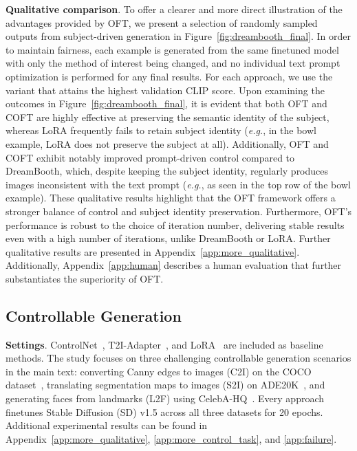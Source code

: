 \textbf{Qualitative comparison}. To offer a clearer and more direct illustration of the advantages provided by OFT, we present a selection of randomly sampled outputs from subject-driven generation in Figure~\ref{fig:dreambooth_final}. In order to maintain fairness, each example is generated from the same finetuned model with only the method of interest being changed, and no individual text prompt optimization is performed for any final results. For each approach, we use the variant that attains the highest validation CLIP score. Upon examining the outcomes in Figure~\ref{fig:dreambooth_final}, it is evident that both OFT and COFT are highly effective at preserving the semantic identity of the subject, whereas LoRA frequently fails to retain subject identity (\emph{e.g.}, in the bowl example, LoRA does not preserve the subject at all). Additionally, OFT and COFT exhibit notably improved prompt-driven control compared to DreamBooth, which, despite keeping the subject identity, regularly produces images inconsistent with the text prompt (\emph{e.g.}, as seen in the top row of the bowl example). These qualitative results highlight that the OFT framework offers a stronger balance of control and subject identity preservation. Furthermore, OFT’s performance is robust to the choice of iteration number, delivering stable results even with a high number of iterations, unlike DreamBooth or LoRA. Further qualitative results are presented in Appendix~\ref{app:more_qualitative}. Additionally, Appendix~\ref{app:human} describes a human evaluation that further substantiates the superiority of OFT.

\subsection{Controllable Generation}

\textbf{Settings}. ControlNet~\cite{zhang2023adding}, T2I-Adapter~\cite{mou2023t2i}, and LoRA~\cite{hulora2022} are included as baseline methods. The study focuses on three challenging controllable generation scenarios in the main text: converting Canny edges to images (C2I) on the COCO dataset~\cite{lin2014microsoft}, translating segmentation maps to images (S2I) on ADE20K~\cite{zhou2017scene}, and generating faces from landmarks (L2F) using CelebA-HQ~\cite{karras2018progressive,xia2021tedigan}. Every approach finetunes Stable Diffusion (SD) v1.5 across all three datasets for 20 epochs. Additional experimental results can be found in Appendix~\ref{app:more_qualitative}, \ref{app:more_control_task}, and \ref{app:failure}.

